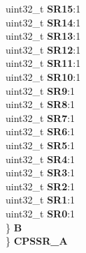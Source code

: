 \begin{DoxyCompactItemize}
\begin{tabbing}
\>\>uint32\_t {\bfseries SR15}:1\\
\>\>uint32\_t {\bfseries SR14}:1\\
\>\>uint32\_t {\bfseries SR13}:1\\
\>\>uint32\_t {\bfseries SR12}:1\\
\>\>uint32\_t {\bfseries SR11}:1\\
\>\>uint32\_t {\bfseries SR10}:1\\
\>\>uint32\_t {\bfseries SR9}:1\\
\>\>uint32\_t {\bfseries SR8}:1\\
\>\>uint32\_t {\bfseries SR7}:1\\
\>\>uint32\_t {\bfseries SR6}:1\\
\>\>uint32\_t {\bfseries SR5}:1\\
\>\>uint32\_t {\bfseries SR4}:1\\
\>\>uint32\_t {\bfseries SR3}:1\\
\>\>uint32\_t {\bfseries SR2}:1\\
\>\>uint32\_t {\bfseries SR1}:1\\
\>\>uint32\_t {\bfseries SR0}:1\\
\>\} {\bfseries B}\\
\} {\bfseries CPSSR\_A}\\


\end{tabbing}
\end{DoxyCompactItemize}
